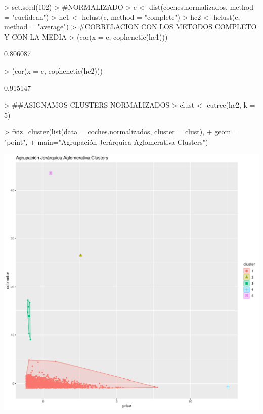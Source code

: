 \documentclass[a4paper]{article}
\begin{document}
\begin{Schunk}
\begin{Sinput}
> set.seed(102)
> #NORMALIZADO
> c <- dist(coches.normalizados, method = "euclidean")
> hc1 <- hclust(c, method = "complete")
> hc2 <- hclust(c, method = "average")
> #CORRELACION CON LOS METODOS COMPLETO Y CON LA MEDIA
> (cor(x = c, cophenetic(hc1)))
\end{Sinput}
\begin{Soutput}
[1] 0.806087
\end{Soutput}
\begin{Sinput}
> (cor(x = c, cophenetic(hc2)))
\end{Sinput}
\begin{Soutput}
[1] 0.915147
\end{Soutput}
\begin{Sinput}
> ##ASIGNAMOS CLUSTERS NORMALIZADOS
> clust <- cutree(hc2, k = 5)
\end{Sinput}
\end{Schunk}
\begin{Schunk}
\begin{Sinput}
> fviz_cluster(list(data = coches.normalizados, cluster = clust), 
+              geom = "point",
+              main="Agrupación Jerárquica Aglomerativa Clusters")
\end{Sinput}
\end{Schunk}
\includegraphics{Practica4-hc}
\end{document}
